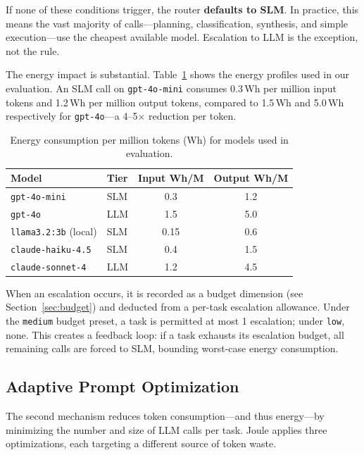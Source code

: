 \noindent If none of these conditions trigger, the router \textbf{defaults to SLM}. In practice, this means the vast majority of calls---planning, classification, synthesis, and simple execution---use the cheapest available model. Escalation to LLM is the exception, not the rule.

The energy impact is substantial. Table~\ref{tab:energy-tiers} shows the energy profiles used in our evaluation. An SLM call on \texttt{gpt-4o-mini} consumes 0.3\,Wh per million input tokens and 1.2\,Wh per million output tokens, compared to 1.5\,Wh and 5.0\,Wh respectively for \texttt{gpt-4o}---a 4--5$\times$ reduction per token.

\begin{table}[h]
\centering
\caption{Energy consumption per million tokens (Wh) for models used in evaluation.}
\label{tab:energy-tiers}
\begin{tabular}{llcc}
\toprule
Model & Tier & Input Wh/M & Output Wh/M \\
\midrule
\texttt{gpt-4o-mini}  & SLM & 0.3 & 1.2 \\
\texttt{gpt-4o}       & LLM & 1.5 & 5.0 \\
\texttt{llama3.2:3b} (local)  & SLM & 0.15 & 0.6 \\
\texttt{claude-haiku-4.5}     & SLM & 0.4 & 1.5 \\
\texttt{claude-sonnet-4}      & LLM & 1.2 & 4.5 \\
\bottomrule
\end{tabular}
\end{table}

When an escalation occurs, it is recorded as a budget dimension (see Section~\ref{sec:budget}) and deducted from a per-task escalation allowance. Under the \texttt{medium} budget preset, a task is permitted at most 1 escalation; under \texttt{low}, none. This creates a feedback loop: if a task exhausts its escalation budget, all remaining calls are forced to SLM, bounding worst-case energy consumption.

\subsection{Adaptive Prompt Optimization}
\label{sec:prompt-opt}

The second mechanism reduces token consumption---and thus energy---by minimizing the number and size of LLM calls per task. Joule applies three optimizations, each targeting a different source of token waste.

